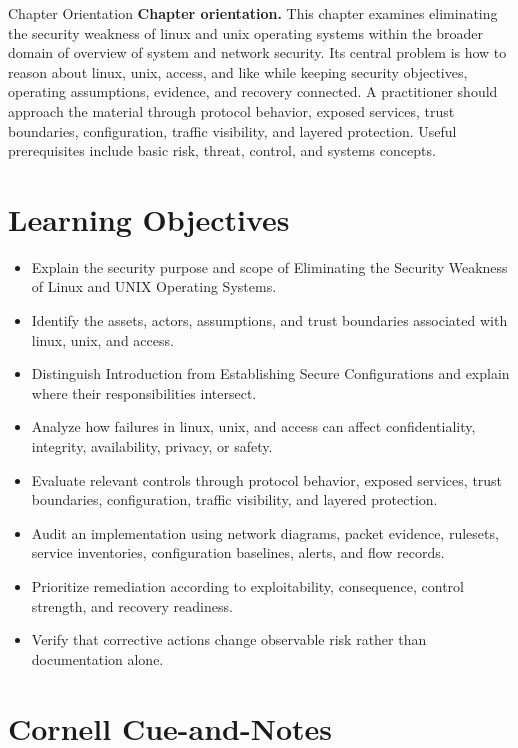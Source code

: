 \documentclass[11pt,letterpaper]{article}
\title{\CornellDocumentTitle}
\author{}
\date{}
\begin{document}
\maketitle
\begin{CornellOverviewBox}{Chapter Orientation}
\textbf{Chapter orientation.} This chapter examines eliminating the security weakness of linux and unix operating systems within the broader domain of overview of system and network security. Its central problem is how to reason about linux, unix, access, and like while keeping security objectives, operating assumptions, evidence, and recovery connected. A practitioner should approach the material through protocol behavior, exposed services, trust boundaries, configuration, traffic visibility, and layered protection. Useful prerequisites include basic risk, threat, control, and systems concepts.
\end{CornellOverviewBox}
\section*{Learning Objectives}
\begin{itemize}
\item Explain the security purpose and scope of Eliminating the Security Weakness of Linux and UNIX Operating Systems.
\item Identify the assets, actors, assumptions, and trust boundaries associated with linux, unix, and access.
\item Distinguish Introduction from Establishing Secure Configurations and explain where their responsibilities intersect.
\item Analyze how failures in linux, unix, and access can affect confidentiality, integrity, availability, privacy, or safety.
\item Evaluate relevant controls through protocol behavior, exposed services, trust boundaries, configuration, traffic visibility, and layered protection.
\item Audit an implementation using network diagrams, packet evidence, rulesets, service inventories, configuration baselines, alerts, and flow records.
\item Prioritize remediation according to exploitability, consequence, control strength, and recovery readiness.
\item Verify that corrective actions change observable risk rather than documentation alone.
\end{itemize}
\section*{Cornell Cue-and-Notes}
\end{document}

